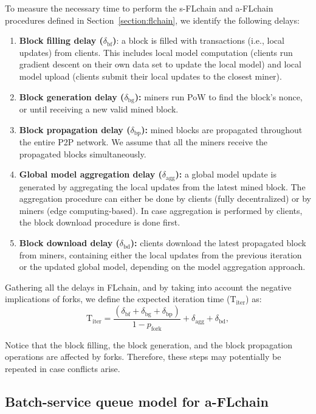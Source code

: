 \documentclass[10pt,journal,compsoc]{IEEEtran}
\begin{document}
To measure the necessary time to perform the s-FLchain and a-FLchain procedures defined in Section~\ref{section:flchain}, we identify the following delays:
\begin{enumerate}
	\item \textbf{Block filling delay ($\delta_\text{bf}$)}: a block is filled with transactions (i.e., local updates) from clients. This includes local model computation (clients run gradient descent on their own data set to update the local model) and local model upload (clients submit their local updates to the closest miner).
	\item \textbf{Block generation delay ($\delta_\text{bg}$):} miners run PoW to find the block's nonce, or until receiving a new valid mined block.
	\item \textbf{Block propagation delay ($\delta_\text{bp}$):} mined blocks are propagated throughout the entire P2P network. We assume that all the miners receive the propagated blocks simultaneously.
	\item \textbf{Global model aggregation delay ($\delta_\text{agg}$):} a global model update is generated by aggregating the local updates from the latest mined block. The aggregation procedure can either be done by clients (fully decentralized) or by miners (edge computing-based). In case aggregation is performed by clients, the block download procedure is done first.
	\item \textbf{Block download delay ($\delta_\text{bd}$):} clients download the latest propagated block from miners, containing either the local updates from the previous iteration or the updated global model, depending on the model aggregation approach.
\end{enumerate}

Gathering all the delays in FLchain, and by taking into account the negative implications of forks, we define the expected iteration time ($\text{T}_\text{iter}$) as:
\begin{equation}
\text{T}_\text{iter} =  \frac{(\delta_\text{bf} + \delta_\text{bg} + \delta_\text{bp})}{1-p_\text{fork}} + \delta_\text{agg} + \delta_\text{bd},
\label{eq:delay}
\end{equation}

Notice that the block filling, the block generation, and the block propagation operations are affected by forks. Therefore, these steps may potentially be repeated in case conflicts arise.

\subsection{Batch-service queue model for a-FLchain}
\end{document}
